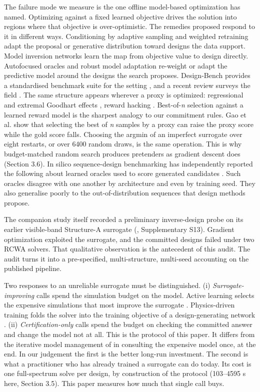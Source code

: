 \documentclass[11pt,a4paper]{article}
\begin{document}
The failure mode we measure is the one offline model-based optimization has named.
Optimizing against a fixed learned objective drives the solution into regions where that
objective is over-optimistic. The remedies proposed respond to it in different ways.
Conditioning by adaptive sampling \cite{brookes201924} and weighted retraining \cite{tripp202025} adapt the proposal or
generative distribution toward designs the data support. Model inversion networks \cite{kumar202013}
learn the map from objective value to design directly. Autofocused oracles \cite{fannjiang202016} and robust
model adaptation \cite{yu202126} re-weight or adapt the predictive model around the designs the
search proposes. Design-Bench provides a standardised benchmark suite for the setting
\cite{trabucco202215}, and a recent review surveys the field \cite{kim202527}. The same structure appears wherever a
proxy is optimized: regressional and extremal Goodhart effects \cite{manheim201828}, reward hacking \cite{skalse202229}.
Best-of-\emph{n} selection against a learned reward model is the sharpest analogy to our
commitment rules. Gao et al. \cite{gao202330} show that selecting the best of \emph{n} samples by a proxy
can raise the proxy score while the gold score falls. Choosing the argmin of an imperfect
surrogate over eight restarts, or over 6400 random draws, is the same operation. This is
why budget-matched random search produces pretenders as gradient descent does
(Section 3.6). In silico sequence-design benchmarking has independently reported the
following about learned oracles used to score generated candidates \cite{surana202531}. Such oracles
disagree with one another by architecture and even by training seed. They also generalise
poorly to the out-of-distribution sequences that design methods propose.

The companion study itself recorded a preliminary inverse-design probe on its earlier
visible-band Structure-A surrogate (\cite{choi20261}, Supplementary S13). Gradient optimization
exploited the surrogate, and the committed designs failed under two RCWA solvers. That
qualitative observation is the antecedent of this audit. The audit turns it into a
pre-specified, multi-structure, multi-seed accounting on the published pipeline.

Two responses to an unreliable surrogate must be distinguished. (i) \emph{Surrogate-improving}
calls spend the simulation budget on the model. Active learning selects the expensive
simulations that most improve the surrogate \cite{pestourie202032}. Physics-driven training folds the solver
into the training objective of a design-generating network \cite{jiang201933}. (ii) \emph{Certification-only}
calls spend the budget on checking the committed answer and change the model not at all.
This is the protocol of this paper. It differs from the iterative model management of
\cite{alexandrov199817,booker199918} in consulting the expensive model once, at the end. In our judgement the first is
the better long-run investment. The second is what a practitioner who has already trained
a surrogate can do today. Its cost is one full-spectrum solve per design, by construction
of the protocol (103--4595 s here, Section 3.5). This paper measures how much that single
call buys.
\end{document}
